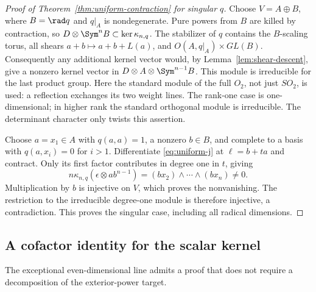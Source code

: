 \begin{proof}[Proof of Theorem~\ref{thm:uniform-contraction} for singular \(q\)]
Choose \(V=A\oplus B\), where \(B=\rad q\) and \(q|_A\)
is nondegenerate.  Pure powers from \(B\) are killed by contraction,
so \(D\otimes\Sym^nB\subset\ker\kappa_{n,q}\).
The stabilizer of \(q\) contains the \(B\)-scaling torus, all
shears \(a+b\mapsto a+b+L(a)\), and \(O(A,q|_A)\times GL(B)\).
Consequently any additional kernel vector would, by
Lemma~\ref{lem:shear-descent}, give a nonzero kernel vector in
\(D\otimes A\otimes\Sym^{n-1}B\).
This module is irreducible for the last product group.  Here the
standard module of the full \(O_2\), not just \(SO_2\), is used:
a reflection exchanges its two weight lines.  The rank-one case is
one-dimensional; in higher rank the standard orthogonal module is
irreducible.  The determinant character only twists this assertion.

Choose \(a=x_1\in A\) with \(q(a,a)=1\), a nonzero \(b\in B\),
and complete to a basis with \(q(a,x_i)=0\) for \(i>1\).
Differentiate \eqref{eq:uniform-j} at \(\ell=b+ta\) and contract.
Only its first factor contributes in degree one in \(t\), giving
\begin{equation}\label{eq:uniform-singular-nonzero}
 n\kappa_{n,q}(\epsilon\otimes ab^{n-1})
       =(bx_2)\wedge\cdots\wedge(bx_n)\ne0.
\end{equation}
Multiplication by \(b\) is injective on \(V\), which proves the
nonvanishing.  The restriction to the irreducible degree-one module
is therefore injective, a contradiction.  This proves the singular
case, including all radical dimensions.
\end{proof}

\subsection{A cofactor identity for the scalar kernel}

The exceptional even-dimensional line admits a proof that does not
require a decomposition of the exterior-power target.

